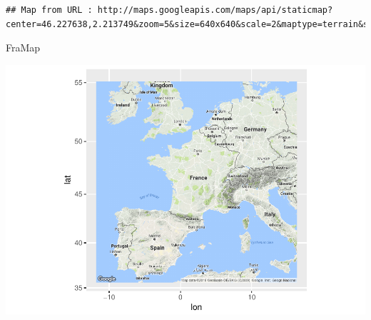 \documentclass[]{article}
\newenvironment{Shaded}{\begin{snugshade}}{\end{snugshade}}
\newcommand{\KeywordTok}[1]{\textcolor[rgb]{0.13,0.29,0.53}{\textbf{#1}}}
\newcommand{\DataTypeTok}[1]{\textcolor[rgb]{0.13,0.29,0.53}{#1}}
\newcommand{\FloatTok}[1]{\textcolor[rgb]{0.00,0.00,0.81}{#1}}
\newcommand{\StringTok}[1]{\textcolor[rgb]{0.31,0.60,0.02}{#1}}
\newcommand{\CommentTok}[1]{\textcolor[rgb]{0.56,0.35,0.01}{\textit{#1}}}
\newcommand{\OperatorTok}[1]{\textcolor[rgb]{0.81,0.36,0.00}{\textbf{#1}}}
\newcommand{\NormalTok}[1]{#1}
\begin{document}
\begin{verbatim}
## Map from URL : http://maps.googleapis.com/maps/api/staticmap?center=46.227638,2.213749&zoom=5&size=640x640&scale=2&maptype=terrain&sensor=false
\end{verbatim}

\begin{Shaded}
\begin{Highlighting}[]
\NormalTok{FraMap}
\end{Highlighting}
\end{Shaded}

\includegraphics{TSLproject_files/figure-latex/unnamed-chunk-11-1.pdf}

\begin{Shaded}
\end{Shaded}
\end{document}
